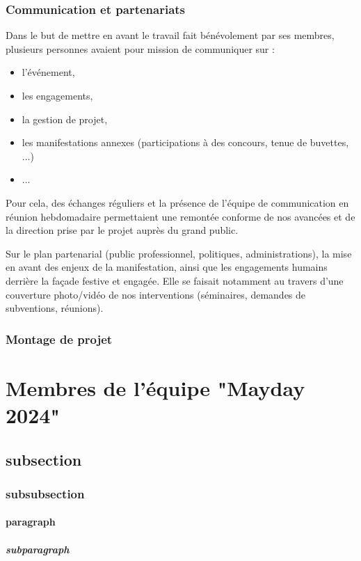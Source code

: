\documentclass[12pt,a4paper]{report}
\begin{document}
\subsubsection{Communication et partenariats}
Dans le but de mettre en avant le travail fait bénévolement par ses membres, plusieurs personnes avaient pour mission de communiquer sur :
\begin{itemize}
\item l'événement,
\item les engagements,
\item la gestion de projet,
\item les manifestations annexes (participations à des concours, tenue de buvettes, ...)
\item ...
\end{itemize}

Pour cela, des échanges réguliers et la présence de l'équipe de communication en réunion hebdomadaire permettaient une remontée conforme de nos avancées et de la direction prise par le projet auprès du grand public.

Sur le plan partenarial (public professionnel, politiques, administrations), la mise en avant des enjeux de la manifestation, ainsi que les engagements humains derrière la façade festive et engagée. Elle se faisait notamment au travers d'une couverture photo/vidéo de nos interventions (séminaires, demandes de subventions, réunions).


\subsubsection{Montage de projet}


\section{Membres de l'équipe "Mayday 2024"}

\subsection{subsection}
\subsubsection{subsubsection}
\paragraph{paragraph}
\subparagraph{subparagraph}
\end{document}
